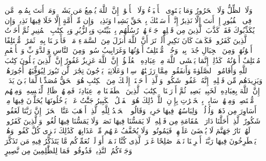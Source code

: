 وَلَا ٱلظِّلُّ وَلَا ٱلۡحَرُورُ%
\stopbuffer
\startbuffer[\q:35:22]
وَمَا یَسۡتَوِی ٱلۡأَحۡیَاۤءُ وَلَا ٱلۡأَمۡوَٰتُۚ إِنَّ ٱللَّهَ یُسۡمِعُ مَن یَشَاۤءُۖ وَمَاۤ أَنتَ بِمُسۡمِعࣲ مَّن فِی ٱلۡقُبُورِ%
\stopbuffer
\startbuffer[\q:35:23]
إِنۡ أَنتَ إِلَّا نَذِیرٌ%
\stopbuffer
\startbuffer[\q:35:24]
إِنَّاۤ أَرۡسَلۡنَٰكَ بِٱلۡحَقِّ بَشِیرࣰا وَنَذِیرࣰاۚ وَإِن مِّنۡ أُمَّةٍ إِلَّا خَلَا فِیهَا نَذِیرࣱ%
\stopbuffer
\startbuffer[\q:35:25]
وَإِن یُكَذِّبُوكَ فَقَدۡ كَذَّبَ ٱلَّذِینَ مِن قَبۡلِهِمۡ جَاۤءَتۡهُمۡ رُسُلُهُم بِٱلۡبَیِّنَٰتِ وَبِٱلزُّبُرِ وَبِٱلۡكِتَٰبِ ٱلۡمُنِیرِ%
\stopbuffer
\startbuffer[\q:35:26]
ثُمَّ أَخَذۡتُ ٱلَّذِینَ كَفَرُوا۟ۖ فَكَیۡفَ كَانَ نَكِیرِ%
\stopbuffer
\startbuffer[\q:35:27]
أَلَمۡ تَرَ أَنَّ ٱللَّهَ أَنزَلَ مِنَ ٱلسَّمَاۤءِ مَاۤءࣰ فَأَخۡرَجۡنَا بِهِۦ ثَمَرَٰتࣲ مُّخۡتَلِفًا أَلۡوَٰنُهَاۚ وَمِنَ ٱلۡجِبَالِ جُدَدُۢ بِیضࣱ وَحُمۡرࣱ مُّخۡتَلِفٌ أَلۡوَٰنُهَا وَغَرَابِیبُ سُودࣱ%
\stopbuffer
\startbuffer[\q:35:28]
وَمِنَ ٱلنَّاسِ وَٱلدَّوَاۤبِّ وَٱلۡأَنۡعَٰمِ مُخۡتَلِفٌ أَلۡوَٰنُهُۥ كَذَٰلِكَۗ إِنَّمَا یَخۡشَى ٱللَّهَ مِنۡ عِبَادِهِ ٱلۡعُلَمَٰۤؤُا۟ۗ إِنَّ ٱللَّهَ عَزِیزٌ غَفُورٌ%
\stopbuffer
\startbuffer[\q:35:29]
إِنَّ ٱلَّذِینَ یَتۡلُونَ كِتَٰبَ ٱللَّهِ وَأَقَامُوا۟ ٱلصَّلَوٰةَ وَأَنفَقُوا۟ مِمَّا رَزَقۡنَٰهُمۡ سِرࣰّا وَعَلَانِیَةࣰ یَرۡجُونَ تِجَٰرَةࣰ لَّن تَبُورَ%
\stopbuffer
\startbuffer[\q:35:30]
لِیُوَفِّیَهُمۡ أُجُورَهُمۡ وَیَزِیدَهُم مِّن فَضۡلِهِۦۤۚ إِنَّهُۥ غَفُورࣱ شَكُورࣱ%
\stopbuffer
\startbuffer[\q:35:31]
وَٱلَّذِیۤ أَوۡحَیۡنَاۤ إِلَیۡكَ مِنَ ٱلۡكِتَٰبِ هُوَ ٱلۡحَقُّ مُصَدِّقࣰا لِّمَا بَیۡنَ یَدَیۡهِۗ إِنَّ ٱللَّهَ بِعِبَادِهِۦ لَخَبِیرُۢ بَصِیرࣱ%
\stopbuffer
\startbuffer[\q:35:32]
ثُمَّ أَوۡرَثۡنَا ٱلۡكِتَٰبَ ٱلَّذِینَ ٱصۡطَفَیۡنَا مِنۡ عِبَادِنَاۖ فَمِنۡهُمۡ ظَالِمࣱ لِّنَفۡسِهِۦ وَمِنۡهُم مُّقۡتَصِدࣱ وَمِنۡهُمۡ سَابِقُۢ بِٱلۡخَیۡرَٰتِ بِإِذۡنِ ٱللَّهِۚ ذَٰلِكَ هُوَ ٱلۡفَضۡلُ ٱلۡكَبِیرُ%
\stopbuffer
\startbuffer[\q:35:33]
جَنَّٰتُ عَدۡنࣲ یَدۡخُلُونَهَا یُحَلَّوۡنَ فِیهَا مِنۡ أَسَاوِرَ مِن ذَهَبࣲ وَلُؤۡلُؤࣰاۖ وَلِبَاسُهُمۡ فِیهَا حَرِیرࣱ%
\stopbuffer
\startbuffer[\q:35:34]
وَقَالُوا۟ ٱلۡحَمۡدُ لِلَّهِ ٱلَّذِیۤ أَذۡهَبَ عَنَّا ٱلۡحَزَنَۖ إِنَّ رَبَّنَا لَغَفُورࣱ شَكُورٌ%
\stopbuffer
\startbuffer[\q:35:35]
ٱلَّذِیۤ أَحَلَّنَا دَارَ ٱلۡمُقَامَةِ مِن فَضۡلِهِۦ لَا یَمَسُّنَا فِیهَا نَصَبࣱ وَلَا یَمَسُّنَا فِیهَا لُغُوبࣱ%
\stopbuffer
\startbuffer[\q:35:36]
وَٱلَّذِینَ كَفَرُوا۟ لَهُمۡ نَارُ جَهَنَّمَ لَا یُقۡضَىٰ عَلَیۡهِمۡ فَیَمُوتُوا۟ وَلَا یُخَفَّفُ عَنۡهُم مِّنۡ عَذَابِهَاۚ كَذَٰلِكَ نَجۡزِی كُلَّ كَفُورࣲ%
\stopbuffer
\startbuffer[\q:35:37]
وَهُمۡ یَصۡطَرِخُونَ فِیهَا رَبَّنَاۤ أَخۡرِجۡنَا نَعۡمَلۡ صَٰلِحًا غَیۡرَ ٱلَّذِی كُنَّا نَعۡمَلُۚ أَوَ لَمۡ نُعَمِّرۡكُم مَّا یَتَذَكَّرُ فِیهِ مَن تَذَكَّرَ وَجَاۤءَكُمُ ٱلنَّذِیرُۖ فَذُوقُوا۟ فَمَا لِلظَّٰلِمِینَ مِن نَّصِیرٍ%

